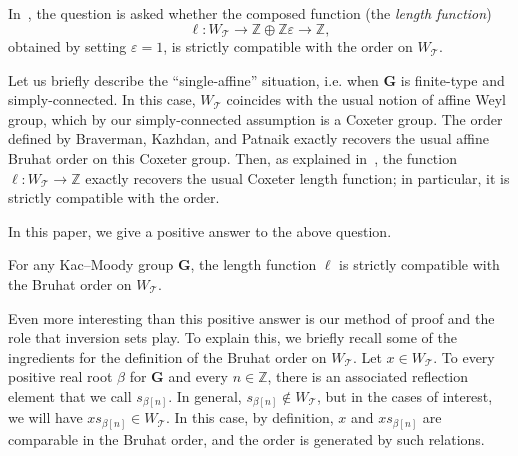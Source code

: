 \documentclass[ALCO,ThmDefs,Unicode]{cedram}
\newcommand{\bG}{\mathbf{G}}
\newcommand{\cT}{\mathcal{T}}
\newcommand{\ZZ}{\mathbb{Z}}
\newcommand{\eps}{\varepsilon}
\newcommand{\WTits}{W_{\TitsCone}}
\newcommand{\TitsCone}{\cT}
\begin{document}
In~\cite[Question~5.10]{M}, the question is asked whether the composed function (the \emph{length function})
\begin{equation}\label{eq:23}
\ell : \WTits \rightarrow \ZZ \oplus \ZZ \eps \rightarrow \ZZ,
\end{equation}
obtained by setting $\varepsilon=1$, is strictly compatible with the order on $\WTits$.

Let us briefly describe the ``single-affine'' situation, i.e. when $\bG$ is finite-type and simply-connected. In this case, $\WTits$ coincides with the usual notion of affine Weyl group, which by our simply-connected assumption is a Coxeter group. The order defined by Braverman, Kazhdan, and Patnaik exactly recovers the usual affine Bruhat order on this Coxeter group. Then, as explained in~\cite{M}, the function $\ell: \WTits \rightarrow \ZZ$ exactly recovers the usual Coxeter length function; in particular, it is strictly compatible with the order.

In this paper, we give a positive answer to the above question.

\begin{theo}
For any Kac--Moody group $\bG$, the length function $\ell$ is strictly compatible with the Bruhat order on $\WTits$.
\end{theo}

Even more interesting than this positive answer is our method of proof and the role that inversion sets play. To explain this, we briefly recall some of the ingredients for the definition of the Bruhat order on $\WTits$. Let $x \in \WTits$. To every positive real root $\beta$ for $\bG$ and every $n \in \ZZ$, there is an associated reflection element that we call $s_{\beta[n]}$. In general, $s_{\beta[n]} \notin \WTits$, but in the cases of interest, we will have $ x s_{\beta[n]} \in \WTits$. In this case, by definition, $x$ and $ x s_{\beta[n]}$ are comparable in the Bruhat order, and the order is generated by such relations.
\end{document}
